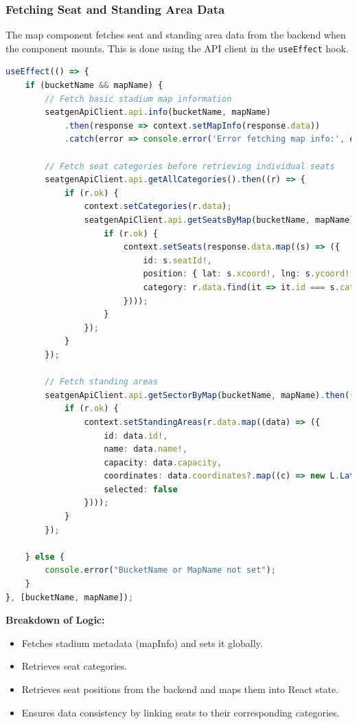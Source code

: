 \subsubsection{Fetching Seat and Standing Area Data}

The map component fetches seat and standing area data from the backend when the component mounts. This is done using the API client in the \texttt{useEffect} hook.

\begin{lstlisting}[language=TypeScript, caption=Fetching Seat and Category Data, label=lst:fetch-seats]
useEffect(() => {
    if (bucketName && mapName) {
        // Fetch basic stadium map information
        seatgenApiClient.api.info(bucketName, mapName)
            .then(response => context.setMapInfo(response.data))
            .catch(error => console.error('Error fetching map info:', error));

        // Fetch seat categories before retrieving individual seats
        seatgenApiClient.api.getAllCategories().then((r) => {
            if (r.ok) {
                context.setCategories(r.data);
                seatgenApiClient.api.getSeatsByMap(bucketName, mapName).then(response => {
                    if (r.ok) {
                        context.setSeats(response.data.map((s) => ({
                            id: s.seatId!,
                            position: { lat: s.xcoord!, lng: s.ycoord! },
                            category: r.data.find(it => it.id === s.categoryId) ?? null
                        })));
                    }
                });
            }
        });

        // Fetch standing areas
        seatgenApiClient.api.getSectorByMap(bucketName, mapName).then((r) => {
            if (r.ok) {
                context.setStandingAreas(r.data.map((data) => ({
                    id: data.id!,
                    name: data.name!,
                    capacity: data.capacity,
                    coordinates: data.coordinates?.map((c) => new L.LatLng(c.x!, c.y!)) ?? [],
                    selected: false
                })));
            }
        });

    } else {
        console.error("BucketName or MapName not set");
    }
}, [bucketName, mapName]);
\end{lstlisting}

\textbf{Breakdown of Logic:}
\begin{itemize}
    \item Fetches stadium metadata (mapInfo) and sets it globally.
    \item Retrieves seat categories.
    \item Retrieves seat positions from the backend and maps them into React state.
    \item Ensures data consistency by linking seats to their corresponding categories.
\end{itemize}

